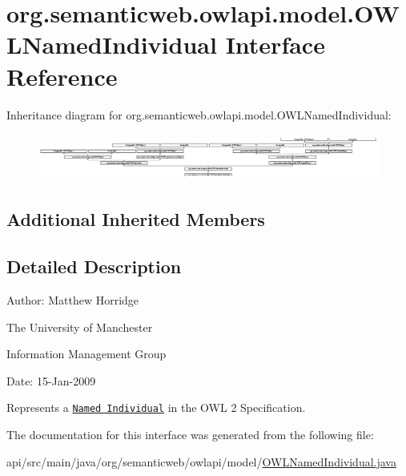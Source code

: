 \hypertarget{interfaceorg_1_1semanticweb_1_1owlapi_1_1model_1_1_o_w_l_named_individual}{\section{org.\-semanticweb.\-owlapi.\-model.\-O\-W\-L\-Named\-Individual Interface Reference}
\label{interfaceorg_1_1semanticweb_1_1owlapi_1_1model_1_1_o_w_l_named_individual}
}
Inheritance diagram for org.\-semanticweb.\-owlapi.\-model.\-O\-W\-L\-Named\-Individual\-:\begin{figure}[H]
\begin{center}
\leavevmode
\includegraphics[height=1.542700cm]{interfaceorg_1_1semanticweb_1_1owlapi_1_1model_1_1_o_w_l_named_individual}
\end{center}
\end{figure}
\subsection*{Additional Inherited Members}


\subsection{Detailed Description}
Author\-: Matthew Horridge\par
 The University of Manchester\par
 Information Management Group\par
 Date\-: 15-\/\-Jan-\/2009 

Represents a \href{http://www.w3.org/TR/2009/REC-owl2-syntax-20091027/#Named_Individuals}{\tt Named Individual} in the O\-W\-L 2 Specification. 

The documentation for this interface was generated from the following file\-:\begin{DoxyCompactItemize}
\item 
api/src/main/java/org/semanticweb/owlapi/model/\hyperlink{_o_w_l_named_individual_8java}{O\-W\-L\-Named\-Individual.\-java}\end{DoxyCompactItemize}
